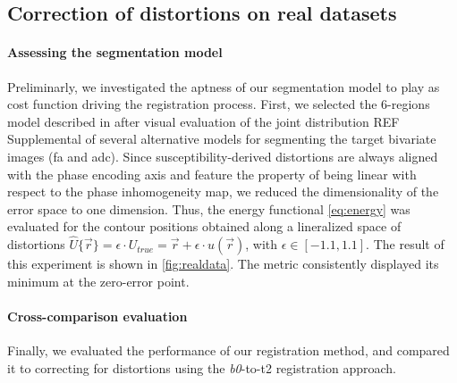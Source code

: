 \subsection*{Correction of distortions on real datasets}\label{sec:results_hcp}

\paragraph*{Assessing the segmentation model}\label{sec:res_model_and_metric} %
%
Preliminarly, we investigated the aptness of our segmentation model to play as cost function
  driving the registration process.
First, we selected the 6-regions model described in  after
  visual evaluation of the joint distribution {\color{red} REF Supplemental} of several
  alternative models for segmenting the target bivariate images (\gls*{fa} and \gls*{adc}).
Since susceptibility-derived distortions are always aligned with the phase encoding axis
  and feature the property of being linear with respect to the phase inhomogeneity map,
  we reduced the dimensionality of the error space to one dimension.
Thus, the energy functional \eqref{eq:energy} was evaluated for the contour positions
  obtained along a lineralized space of distortions
  $\hat{U}\{\vec{r}\} = \epsilon \cdot U_{true} = \vec{r} + \epsilon \cdot u(\vec{r})$,
  with $\epsilon \in [-1.1, 1.1]$.
The result of this experiment is shown in \autoref{fig:realdata}.
The metric consistently displayed its minimum at the zero-error point.

\paragraph*{Cross-comparison evaluation}\label{sec:res_cc_evaluation}
%
Finally, we evaluated the performance of our registration method, and compared it to correcting
  for distortions using the \emph{b0}-to-\gls*{t2} registration approach.